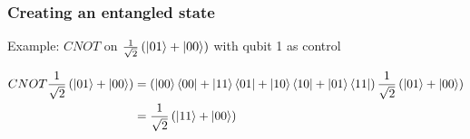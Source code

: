 \documentclass[10pt]{beamer}
\begin{document}
\begin{frame}
  \frametitle{Creating an entangled state}
  \begin{block}{Example: $CNOT$ on $\frac{1}{\sqrt{2}}\left( \ket{01}+\ket{00} \right)$ with qubit 1 as control}
    
    \scriptsize
\begin{align*}
  CNOT \frac{1}{\sqrt{2}}\left( \ket{01}+\ket{00} \right) &= \left( \ket{00}\bra{00}+\ket{11}\bra{01}+\ket{10}\bra{10}+\ket{01}\bra{11} \right)\frac{1}{\sqrt{2}}\left( \ket{01}+\ket{00} \right) \\
  &= \frac{1}{\sqrt{2}}\left( \ket{11} + \ket{00} \right)
\end{align*}
    
  \end{block}
\end{frame}
\end{document}
